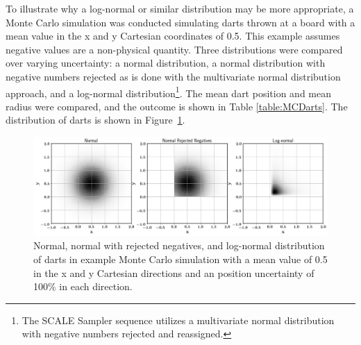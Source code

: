 To illustrate why a log-normal or similar distribution may be more appropriate, a Monte Carlo simulation was conducted simulating darts thrown at a board with a mean value in the x and y Cartesian coordinates of 0.5. 
This example assumes negative values are a non-physical quantity.
Three distributions were compared over varying uncertainty: a normal distribution, a normal distribution with negative numbers rejected as is done with the multivariate normal distribution approach, and a log-normal distribution\footnote{The SCALE Sampler sequence utilizes a multivariate normal distribution with negative numbers rejected and reassigned.}. 
The mean dart position and mean radius were compared, and the outcome is shown in Table \ref{table:MCDarts}. 
The distribution of darts is shown in \mbox{Figure \ref{fig:darts}}. 

\begin{figure}[!htbp]
	\centering
	\includegraphics[width=\linewidth]{Figures/Chapter3/Normal.png}
	\caption{Normal, normal with rejected negatives, and log-normal distribution of darts in example Monte Carlo simulation with a mean value of 0.5 in the x and y Cartesian directions and an position uncertainty of 100\% in each direction.}
	\label{fig:darts}
\end{figure}

